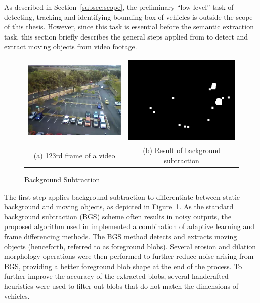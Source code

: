 As described in Section~\ref{subsec:scope}, the preliminary ``low-level'' task of detecting, tracking and identifying bounding box of vehicles is outside the scope of this thesis. However, since this task is essential before the semantic extraction task, this section briefly describes the general steps applied from \cite{lim2017} to detect and extract moving objects from video footage. 
\begin{figure}[htb!]
  \centering
  \begin{tabular}{cc}
  \includegraphics[width=0.4\linewidth]{image/general/bgs1.png} &
  \includegraphics[width=0.4\linewidth]{image/general/bgs2.png}  \\
  (a) 123rd frame of a video & (b) Result of background subtraction \\
  \end{tabular}
  \caption{Background Subtraction}
  \label{fig:bgs}
\end{figure}

The first step applies background subtraction to differentiate between static background and moving objects, as depicted in Figure~\ref{fig:bgs}. As the standard background subtraction (BGS) scheme often results in noisy outputs, the proposed algorithm used in \cite{lim2017} implemented a combination of adaptive learning and frame differencing methods. The BGS method detects and extracts moving objects (henceforth, referred to as foreground blobs).
Several erosion and dilation morphology operations were then performed to further reduce noise arising from BGS, providing a better foreground blob shape at the end of the process.
To further improve the accuracy of the extracted blobs, several handcrafted heuristics were used to filter out blobs that do not match the dimensions of vehicles.

